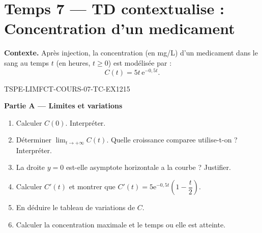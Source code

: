 
\section*{Temps 7 — TD contextualise : Concentration d'un medicament}

\textbf{Contexte.} Après injection, la concentration (en mg/L) d'un medicament dans le sang au temps $t$ (en heures, $t \geq 0$) est modélisée par :
\[
  C(t) = 5t\,\mathrm{e}^{-0{,}5t}.
\]

\bigskip


\begin{exercice}{TSPE-LIMFCT-COURS-07-TC-EX1}{2}{15}

\textbf{Partie A — Limites et variations}

\begin{enumerate}
  \item Calculer $C(0)$. Interpréter.
  \item Déterminer $\lim_{t \to +\infty} C(t)$. Quelle croissance comparee utilise-t-on ? Interpréter.
  \item La droite $y = 0$ est-elle asymptote horizontale a la courbe ? Justifier.
  \item Calculer $C'(t)$ et montrer que $C'(t) = 5\mathrm{e}^{-0{,}5t}\left(1 - \dfrac{t}{2}\right)$.
  \item En déduire le tableau de variations de $C$.
  \item Calculer la concentration maximale et le temps ou elle est atteinte.
\end{enumerate}

\end{exercice}


